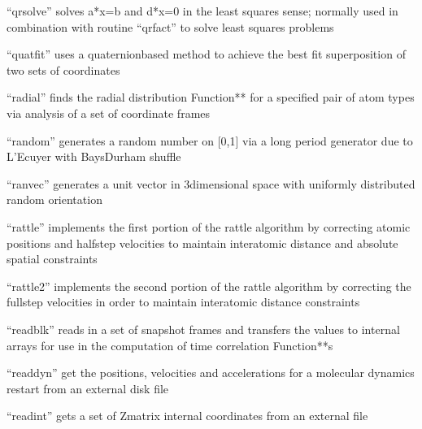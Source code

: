 \documentclass[letterpaper,11pt,english]{sphinxmanual}
\begin{document}

“qrsolve” solves a*x=b and d*x=0 in the least squares sense; normally used in combination with routine “qrfact” to solve least squares problems


“quatfit” uses a quaternion\sphinxhyphen{}based method to achieve the best fit superposition of two sets of coordinates


“radial” finds the radial distribution Function** for a specified pair of atom types via analysis of a set of coordinate frames


“random” generates a random number on {[}0,1{]} via a long period generator due to L’Ecuyer with Bays\sphinxhyphen{}Durham shuffle


“ranvec” generates a unit vector in 3\sphinxhyphen{}dimensional space with uniformly distributed random orientation


“rattle” implements the first portion of the rattle algorithm by correcting atomic positions and half\sphinxhyphen{}step velocities to maintain interatomic distance and absolute spatial constraints


“rattle2” implements the second portion of the rattle algorithm by correcting the full\sphinxhyphen{}step velocities in order to maintain interatomic distance constraints


“readblk” reads in a set of snapshot frames and transfers the values to internal arrays for use in the computation of time correlation Function**s


“readdyn” get the positions, velocities and accelerations for a molecular dynamics restart from an external disk file


“readint” gets a set of Z\sphinxhyphen{}matrix internal coordinates from an external file

\end{document}
